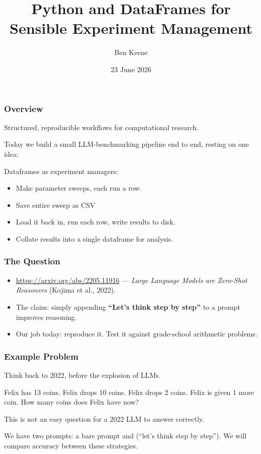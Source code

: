 \documentclass{beamer}
\title{Python and DataFrames for Sensible Experiment Management}
\author{Ben Keene}
\institute{University of Central Florida}
\date{23 June 2026}
\begin{document}
\frame{\titlepage}

\begin{frame}
    \frametitle{Overview}
    Structured, reproducible workflows for computational research.

    \bigskip

    Today we build a small LLM-benchmarking pipeline end to end, resting on
    one idea:

    \begin{alertblock}{\centering Dataframes as experiment managers:}
        \begin{itemize}
            \item Make parameter sweeps, each run a row.
            \item Save entire sweep as CSV
            \item Load it back in, run each row, write results to disk.
            \item Collate results into a single dataframe for analysis.
        \end{itemize}
    \end{alertblock}
\end{frame}

\begin{frame}
    \frametitle{The Question}
    \begin{itemize}
        \item \url{https://arxiv.org/abs/2205.11916} --- \emph{Large Language
              Models are Zero-Shot Reasoners} (Kojima et al., 2022).
        \item The claim: simply appending
              \textbf{``Let's think step by step''} to a prompt improves
              reasoning.
        \item Our job today: reproduce it. Test it against grade-school arithmetic problems.
    \end{itemize}
\end{frame}

\begin{frame}[fragile]
    \frametitle{Example Problem}
    Think back to 2022, before the explosion of LLMs.

    \bigskip

    Felix has 13 coins. Felix drops 10 coins. Felix drops 2 coins. Felix is
    given 1 more coin. How many coins does Felix have now?

    \bigskip

    This is not an easy question for a 2022 LLM to answer correctly.

    \bigskip

    We have two prompts: a bare  prompt and 
    (``let's think step by step'').
    We will compare accuracy between these strategies.
\end{frame}
\end{document}
